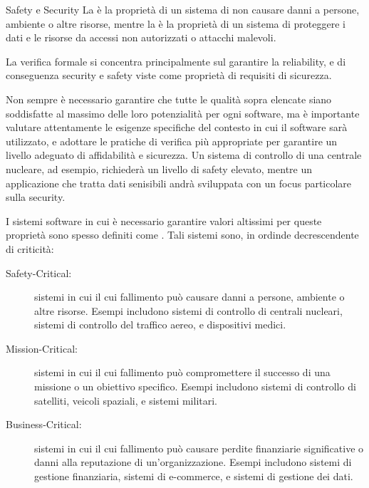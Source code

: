 \begin{definition}{Safety e Security}
  La  è la proprietà di un sistema di non causare danni a persone, ambiente o altre risorse, mentre la  è la proprietà di un sistema di proteggere i dati e le risorse da accessi non autorizzati o attacchi malevoli.
\end{definition}

La verifica formale si concentra principalmente sul garantire la reliability, e di conseguenza security e safety viste come proprietà  di requisiti di sicurezza.

Non sempre è necessario garantire che tutte le qualità sopra elencate siano soddisfatte al massimo delle loro potenzialità per ogni software, ma è importante valutare attentamente le esigenze specifiche del contesto in cui il software sarà utilizzato, e adottare le pratiche di verifica più appropriate per garantire un livello adeguato di affidabilità e sicurezza.
Un sistema di controllo di una centrale nucleare, ad esempio, richiederà un livello di safety elevato, mentre un applicazione che tratta dati senisibili andrà sviluppata con un focus particolare sulla security.

I sistemi software in cui è necessario garantire valori altissimi per queste proprietà sono spesso definiti come . Tali sistemi sono, in ordinde decrescendente di criticità:
\begin{description}
  \item[Safety-Critical:] sistemi in cui il cui fallimento può causare danni a persone, ambiente o altre risorse. Esempi includono sistemi di controllo di centrali nucleari, sistemi di controllo del traffico aereo, e dispositivi medici.
  \item[Mission-Critical:] sistemi in cui il cui fallimento può compromettere il successo di una missione o un obiettivo specifico. Esempi includono sistemi di controllo di satelliti, veicoli spaziali, e sistemi militari.
  \item[Business-Critical:] sistemi in cui il cui fallimento può causare perdite finanziarie significative o danni alla reputazione di un'organizzazione. Esempi includono sistemi di gestione finanziaria, sistemi di e-commerce, e sistemi di gestione dei dati.
\end{description}

